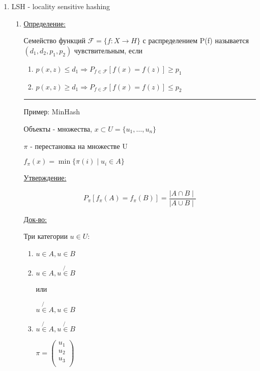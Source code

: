 \documentclass[a4paper, 12pt]{article}
\begin{document}
\begin{enumerate}
    \item LSH - locality sensitive hashing
    \begin{enumerate}
        \item \underline{Определение:}
        
        Семейство функций $\mathcal{F} = \{f: X \to H\}$
        с распределением P(f) называется $(d_1, d_2, p_1, p_2)$
        чувствительным, если

        \begin{enumerate}
            \item $p(x, z) \leq d_1 \Rightarrow 
            P_{f \in \mathcal{F}}[f(x) = f(z)] \geq p_1$
            \item $p(x, z) \geq d_1 \Rightarrow 
            P_{f \in \mathcal{F}}[f(x) = f(z)] \leq p_2$
        \end{enumerate}

        \rule{\linewidth}{0.5pt}
        
        Пример: MinHash

        Объекты - множества, $x \subset U = \{u_1, \ldots, u_n\}$

        $\pi$ - перестановка на множестве U

        $f_{\pi}(x) = \min \{\pi(i) \mid u_i \in A\}$

        \underline{Утверждение:}

        \[P_{\pi}[f_{\pi}(A) = f_{\pi}(B)] = 
        \frac{\mid A \cap B \mid}{\mid A \cup B \mid}\]

        \underline{Док-во:}

        Три категории $u \in U$:

        \begin{enumerate}
            \item $u \in A, u \in B$
            \item $u \in A, u \not{\in} B$
            
            или

            $u \not{\in} A, u \in B$
            \item $u \not{\in} A, u \not{\in} B$
            
            $\pi = 
            \begin{pmatrix}
                u_1 \\
                u_2 \\
                u_3 \\
            \end{pmatrix}$


\end{enumerate}
\end{enumerate}
\end{enumerate}
\end{document}
